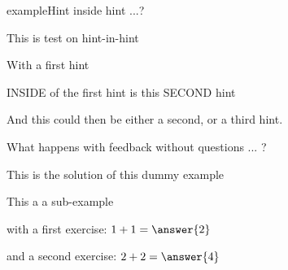 \documentclass{ximera}
\begin{document}
    \begin{expandable}{example}{Hint inside hint ...?}
        
        This is test on hint-in-hint 

        \begin{hint} With a first hint 
            \begin{hint} INSIDE of the first hint is this SECOND hint\end{hint}
        \end{hint}

        \begin{hint} And this could then be either a second, or a third hint.
        \end{hint}

        \begin{feedback} What happens with feedback without questions ... ?
        \end{feedback}
        
        \begin{oplossing} This is the solution of this dummy example
        \end{oplossing}

        \begin{example} This a a sub-example
        
            \begin{exercise} with a first exercise: 
                $1+1=\answer{2}$
                \begin{exercise} and a second exercise: $2+2=\answer{4}$

                \end{exercise}
            \end{exercise}
        \end{example}

    \end{expandable}    
\end{document}
